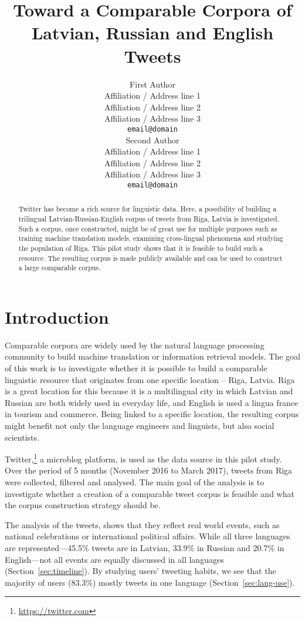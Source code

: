 \documentclass[11pt,a4paper]{article}
\title{Toward a Comparable Corpora of Latvian, Russian and English Tweets}
\author{First Author \\
  Affiliation / Address line 1 \\
  Affiliation / Address line 2 \\
  Affiliation / Address line 3 \\
  {\tt email@domain} \\\And
  Second Author \\
  Affiliation / Address line 1 \\
  Affiliation / Address line 2 \\
  Affiliation / Address line 3 \\
  {\tt email@domain} \\}
\date{}
\begin{document}
\maketitle

\begin{abstract}
Twitter has become a rich source for linguistic data. Here, a possibility of building a trilingual Latvian-Russian-English corpus of tweets from Riga, Latvia is investigated. Such a corpus, once constructed, might be of great use for multiple purposes such as training machine translation models, examining cross-lingual phenomena and studying the population of Riga. This pilot study shows that it is feasible to build such a resource. The resulting corpus is made publicly available and can be used to construct a large comparable corpus.
\end{abstract}

\section{Introduction}
\label{sec:introduction}

Comparable corpora are widely used by the natural language processing community to build machine translation or information retrieval models. The goal of this work is to investigate whether it is possible to build a comparable linguistic resource that originates from one specific location -- Riga, Latvia. Riga is a great location for this because it is a multilingual city in which Latvian and Russian are both widely used in everyday life, and English is used a lingua france in tourism and commerce. Being linked to a specific location, the resulting corpus might benefit not only the language engineers and linguists, but also social scientists.

Twitter,\footnote{\url{https://twitter.com}} a microblog platform, is used as the data source in this pilot study. Over the period of 5 months (November 2016 to March 2017), tweets from Riga were collected, filtered and analysed. The main goal of the analysis is to investigate whether a creation of a comparable tweet corpus is feasible and what the corpus construction strategy should be.

The analysis of the tweets, shows that they reflect real world events, such as national celebrations or international political affairs. While all three languages are represented---45.5\% tweets are in Latvian, 33.9\% in Russian and 20.7\% in English---not all events are equally discussed in all languages (Section~\ref{sec:timeline}). By studying users' tweeting habits, we see that the majority of users (83.3\%) mostly tweets in one language (Section~\ref{sec:lang-use}).
\end{document}
